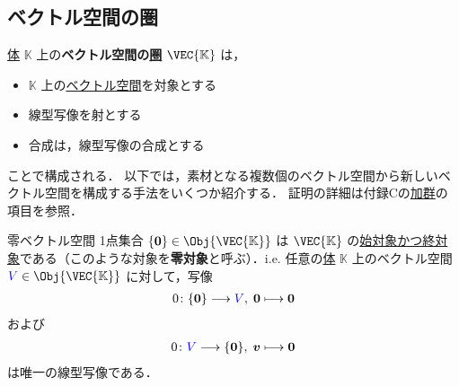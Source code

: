 \documentclass[geometry_main]{subfiles}
\begin{document}
\subsection{ベクトル空間の圏}

\hyperref[ax:ring]{体} $\mathbb{K}$ 上の\textbf{ベクトル空間の\hyperref[def:category]{圏}} $\VEC{\mathbb{K}}$ は，
\begin{itemize}
	\item $\mathbb{K}$ 上の\hyperref[ax.vector]{ベクトル空間}を対象とする
	\item 線型写像を射とする
	\item 合成は，線型写像の合成とする
\end{itemize}
ことで構成される．
以下では，素材となる複数個のベクトル空間から新しいベクトル空間を構成する手法をいくつか紹介する．
証明の詳細は付録Cの\hyperref[ax:module]{加群}の項目を参照．

\begin{myprop}[label=prop:initial-terminal-vec]{零ベクトル空間}
	1点集合 $\{\bm{0}\} \in \Obj{\VEC{\mathbb{K}}}$ は $\VEC{\mathbb{K}}$ の\hyperref[def:initial-terminal]{始対象かつ終対象}である（このような対象を\textbf{零対象}と呼ぶ）．i.e.
	任意の\hyperref[ax:ring]{体} $\mathbb{K}$ 上のベクトル空間 $\textcolor{blue}{V} \in \Obj{\VEC{\mathbb{K}}}$ に対して，写像
	\begin{align}
		0 \colon \{\bm{0}\} \longrightarrow \textcolor{blue}{V},\; \bm{0} \longmapsto \bm{0}
	\end{align}
	および
	\begin{align}
		0 \colon \textcolor{blue}{V} \longrightarrow \{\bm{0}\},\; \bm{v} \longmapsto \bm{0}
	\end{align}
	は唯一の線型写像である．
\end{myprop}
\end{document}
